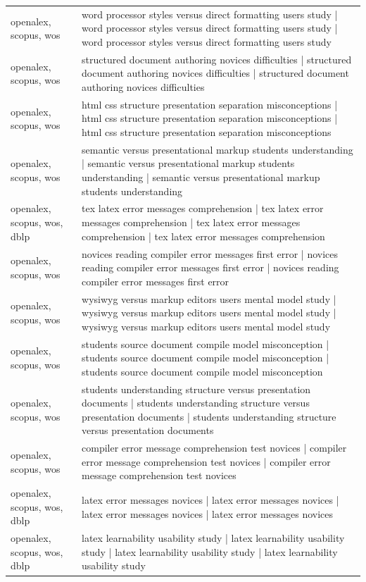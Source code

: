 \documentclass{article}
\begin{document}
\begin{longtable}{lp{10cm}}
openalex, scopus, wos & word processor styles versus direct formatting users study | word processor styles versus direct formatting users study | word processor styles versus direct formatting users study \\
openalex, scopus, wos & structured document authoring novices difficulties | structured document authoring novices difficulties | structured document authoring novices difficulties \\
openalex, scopus, wos & html css structure presentation separation misconceptions | html css structure presentation separation misconceptions | html css structure presentation separation misconceptions \\
openalex, scopus, wos & semantic versus presentational markup students understanding | semantic versus presentational markup students understanding | semantic versus presentational markup students understanding \\
openalex, scopus, wos, dblp & tex latex error messages comprehension | tex latex error messages comprehension | tex latex error messages comprehension | tex latex error messages comprehension \\
openalex, scopus, wos & novices reading compiler error messages first error | novices reading compiler error messages first error | novices reading compiler error messages first error \\
openalex, scopus, wos & wysiwyg versus markup editors users mental model study | wysiwyg versus markup editors users mental model study | wysiwyg versus markup editors users mental model study \\
openalex, scopus, wos & students source document compile model misconception | students source document compile model misconception | students source document compile model misconception \\
openalex, scopus, wos & students understanding structure versus presentation documents | students understanding structure versus presentation documents | students understanding structure versus presentation documents \\
openalex, scopus, wos & compiler error message comprehension test novices | compiler error message comprehension test novices | compiler error message comprehension test novices \\
openalex, scopus, wos, dblp & latex error messages novices | latex error messages novices | latex error messages novices | latex error messages novices \\
openalex, scopus, wos, dblp & latex learnability usability study | latex learnability usability study | latex learnability usability study | latex learnability usability study \\

\end{longtable}
\end{document}
